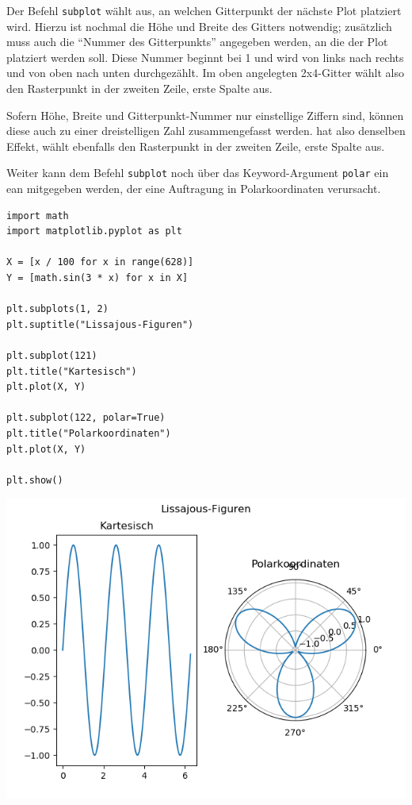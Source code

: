 Der Befehl \texttt{subplot} wählt aus, an welchen Gitterpunkt der nächste Plot platziert wird. Hierzu ist nochmal die Höhe und Breite des Gitters notwendig; zusätzlich muss auch die \enquote{Nummer des Gitterpunkts} angegeben werden, an die der Plot platziert werden soll. Diese Nummer beginnt bei 1 und wird von links nach rechts und von oben nach unten durchgezählt.
Im oben angelegten 2x4-Gitter wählt also
den Rasterpunkt in der zweiten Zeile, erste Spalte aus.

Sofern Höhe, Breite und Gitterpunkt-Nummer nur einstellige Ziffern sind, können diese auch zu einer dreistelligen Zahl zusammengefasst werden.
hat also denselben Effekt, wählt ebenfalls den Rasterpunkt in der zweiten Zeile, erste Spalte aus.

Weiter kann dem Befehl \texttt{subplot} noch über das Keyword-Argument \texttt{polar} ein ean mitgegeben werden, der eine Auftragung in Polarkoordinaten verursacht.

\begin{codebox}[Beispiel: Lissajous-Figuren, width=.55\linewidth, nobeforeafter, equal height group = grpXmpLissajous]
\begin{verbatim}
import math
import matplotlib.pyplot as plt

X = [x / 100 for x in range(628)]
Y = [math.sin(3 * x) for x in X]

plt.subplots(1, 2)
plt.suptitle("Lissajous-Figuren")

plt.subplot(121)
plt.title("Kartesisch")
plt.plot(X, Y)

plt.subplot(122, polar=True)
plt.title("Polarkoordinaten")
plt.plot(X, Y)

plt.show()
\end{verbatim}
\end{codebox}
%
\begin{tcolorbox}[title=Ausgabe: Lissajous-Figuren, width=.45\linewidth, nobeforeafter, equal height group = grpXmpLissajous]
	\includegraphics[width=\linewidth]{./gfx/plt-Lissajous}
\end{tcolorbox}

